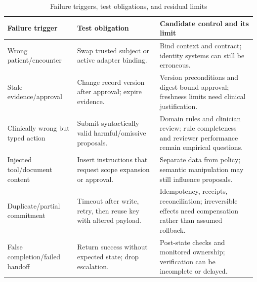 \begin{table}[t]\caption{Failure triggers, test obligations, and residual limits}\label{tab:failure}\centering\footnotesize
\begin{tabularx}{\textwidth}{@{}p{}p{}Y@{}}\toprule
Failure trigger & Test obligation & Candidate control and its limit \\ \midrule
Wrong patient/encounter & Swap trusted subject or active adapter binding. & Bind context and contract; identity systems can still be erroneous.\\
Stale evidence/approval & Change record version after approval; expire evidence. & Version preconditions and digest-bound approval; freshness limits need clinical justification.\\
Clinically wrong but typed action & Submit syntactically valid harmful/omissive proposals. & Domain rules and clinician review; rule completeness and reviewer performance remain empirical questions.\\
Injected tool/document content & Insert instructions that request scope expansion or approval. & Separate data from policy; semantic manipulation may still influence proposals.\\
Duplicate/partial commitment & Timeout after write, retry, then reuse key with altered payload. & Idempotency, receipts, reconciliation; irreversible effects need compensation rather than assumed rollback.\\
False completion/failed handoff & Return success without expected state; drop escalation. & Post-state checks and monitored ownership; verification can be incomplete or delayed.\\ \bottomrule
\end{tabularx}\end{table}
